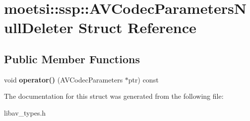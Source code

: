 \hypertarget{structmoetsi_1_1ssp_1_1AVCodecParametersNullDeleter}{}\section{moetsi\+:\+:ssp\+:\+:A\+V\+Codec\+Parameters\+Null\+Deleter Struct Reference}
\label{structmoetsi_1_1ssp_1_1AVCodecParametersNullDeleter}
\subsection*{Public Member Functions}
\begin{DoxyCompactItemize}
\item 
\mbox{\label{structmoetsi_1_1ssp_1_1AVCodecParametersNullDeleter_ac16822d72c027d1eb8e66a0fe37a5d57}} 
void {\bfseries operator()} (A\+V\+Codec\+Parameters $\ast$ptr) const
\end{DoxyCompactItemize}


The documentation for this struct was generated from the following file\+:\begin{DoxyCompactItemize}
\item 
libav\+\_\+types.\+h\end{DoxyCompactItemize}

